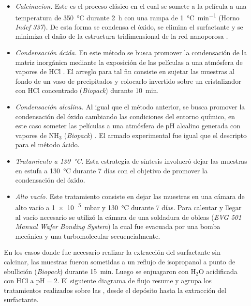 				\begin{itemize}

				\item \textit{Calcinacion.} Este es el proceso clásico en el cual se somete a la película a una temperatura de \SI{350}{\celsius} durante \SI{2}{\hour} con una rampa de \SI{1}{\celsius.\minute^{-1}} (Horno \textit{Indef 337}). De esta forma se condensa el óxido, se elimina el surfactante y se minimiza el daño de la estructura tridimensional de la red nanoporosa \cite{Crepaldi2003}.

				\item \textit{Condensación ácida.} En este método se busca promover la condensación de la matriz inorgánica mediante la exposición de las películas a una atmósfera de vapores de HCl \cite{Doshi2000a}. El arreglo para tal fin consiste en sujetar las muestras al fondo de un vaso de precipitados y colocarlo invertido sobre un cristalizador con HCl concentrado (\textit{Biopack}) durante \SI{10}{\minute}. 

				\item \textit{Condensación alcalina.} Al igual que el método anterior, se busca promover la condensación del óxido cambiando las condiciones del entorno químico, en este caso someter las películas a una atmósfera de pH alcalino generada con vapores de NH$_3$ (\textit{Biopack}) \cite{Soler-Illia2012,Soler-Illia2011}. El armado experimental fue igual que el descripto para el método ácido.

				\item \textit{Tratamiento a \SI{130}{\celsius}.} Esta estrategia de síntesis involucró dejar las muestras en estufa a \SI{130}{\celsius} durante 7 días con el objetivo de promover la condensación del óxido.

				\item \textit{Alto vacío.} Este tratamiento consiste en dejar las muestras en una cámara de alto vacío a \SI{1e-5}{\milli\bar} y \SI{130}{\celsius} durante 7 días. Para calentar y llegar al vacío necesario se utilizó la cámara de una soldadura de obleas (\textit{EVG 501 Manual Wafer Bonding System}) la cual fue evacuada por una bomba mecánica y una turbomolecular secuencialmente.

				\end{itemize}
					
		En los casos donde fue necesario realizar la extracción del surfactante sin calcinar, las muestras fueron sometidas a un reflujo de isopropanol a punto de ebullición (\textit{Biopack}) durante \SI{15}{\minute}. Luego se enjuagaron con H$_2$O acidificada con HCl a $\text{pH}=2$. El siguiente diagrama de flujo resume y agrupa los tratamientos realizados sobre las \pdm, desde el depósito hasta la extracción del surfactante.
		
